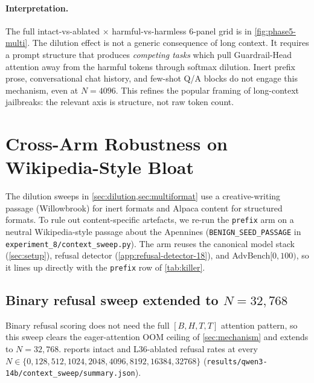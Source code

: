 \documentclass[10pt,twocolumn]{article}
\newcommand{\Ncontext}{N}
\newcommand{\advbench}{AdvBench}
\newcommand{\alpaca}{Alpaca}
\theoremstyle{definition}
\begin{document}
\paragraph{Interpretation.}
The full intact-vs-ablated $\times$ harmful-vs-harmless 6-panel grid
is in \cref{fig:phase5-multi}. The dilution effect is not a generic consequence of long context. It
requires a prompt structure that produces \emph{competing tasks} which
pull Guardrail-Head attention away from the harmful tokens through
softmax dilution. Inert prefix prose, conversational chat history, and
few-shot Q/A blocks do not engage this mechanism, even at
$\Ncontext{=}4096$. This refines the popular framing of long-context
jailbreaks: the relevant axis is structure, not raw token count.

\section{Cross-Arm Robustness on Wikipedia-Style Bloat}
\label{sec:wiki-arm}

The dilution sweeps in \cref{sec:dilution,sec:multiformat} use a
creative-writing passage (Willowbrook) for inert formats and \alpaca{}
content for structured formats. To rule out content-specific
artefacts, we re-run the \texttt{prefix} arm on a neutral
Wikipedia-style passage about the Apennines
(\texttt{BENIGN\_SEED\_PASSAGE} in
\texttt{experiment\_8/context\_sweep.py}). The arm reuses the
canonical model stack (\cref{sec:setup}), refusal detector
(\cref{app:refusal-detector-18}), and \advbench{}$[0, 100)$, so it
lines up directly with the \texttt{prefix} row of \cref{tab:killer}.

\subsection{Binary refusal sweep extended to $\Ncontext{=}32{,}768$}
\label{sec:wiki-baseline}

Binary refusal scoring does not need the full $[B,H,T,T]$ attention
pattern, so this sweep clears the eager-attention OOM ceiling of
\cref{sec:mechanism} and extends to $\Ncontext{=}32{,}768$.
 reports intact and L36-ablated refusal rates
at every $\Ncontext \in \{0, 128, 512, 1024, 2048, 4096, 8192, 16384,
32768\}$ (\texttt{results/qwen3-14b/context\_sweep/summary.json}).
\end{document}
